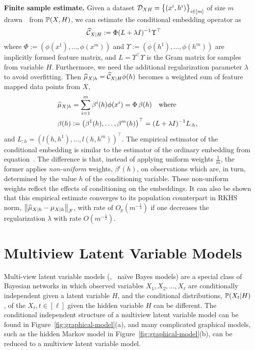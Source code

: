 \documentclass{article}
\newcommand{\hmu}{\widehat{\mu}}
\begin{document}
{\bf Finite sample estimate.} Given a dataset $\mathcal{D}_{XH}=\left\{(x^i,h^i)\right\}_{i\in[m]}$ of size $m$ drawn~\iid~from $\mathbb{P}(X,H)$, we can estimate the conditional embedding operator as
\begin{align}
    & \widehat{\mathcal{C}}_{X|H} := \Phi (L + \lambda I)^{-1} \Upsilon^\top  \label{eq:embeddingoperatorestimator}
\end{align}
where $\Phi:=(\phi(x^1),\ldots,\phi(x^m))$ and $\Upsilon:=(\phi(h^1),\ldots,\phi(h^m))$ are implicitly formed feature matrix, and $L=\Upsilon^\top \Upsilon$ is the Gram matrix for samples from variable $H$. Furthermore, we need the additional regularization parameter $\lambda$ to avoid overfitting. Then $\hmu_{X|h}=\widehat{\Ccal}_{X|H}\phi(h)$ becomes a weighted sum of feature mapped data points from $X$,
\begin{align}
    & \hmu_{X|h} = \sum_{i=1}^m \beta^i(h) \phi(x^i) = \Phi\, \beta(h) \quad \text{where} \,  \label{eq:conditionalembeddingestimator}\\
    & \beta(h) := \rbr{\beta^1(h), \ldots, \beta^m(h)}^\top = (L + \lambda I)^{-1} L_{: h}, \nonumber
\end{align}
and $L_{: h}=(l(h,h^1),\ldots,l(h,h^m))^\top$.
The empirical estimator of the conditional embedding
is similar to the estimator of the ordinary embedding from
equation~. The difference
is that, instead of applying uniform weights $\frac{1}{m}$,
the former applies {\em non-uniform} weights, $\beta^i(h)$, on
observations which are, in turn, determined by the value $h$ of the conditioning
variable. These non-uniform weights reflect the effects of
conditioning on the embeddings. It can also be shown that this empirical estimate converges to its population counterpart in RKHS norm, $\nbr{\hmu_{X|h} - \mu_{X|h}}_{\Fcal}$, with rate of $O_p(m^{-\frac{1}{4}})$ if one decreases the regularization $\lambda$ with rate $O(m^{-\frac{1}{2}})$.

\section{Multiview Latent Variable Models}

Multi-view latent variable models (\eg, \, na\"ive Bayes models) are a
special class of Bayesian networks in which observed variables $X_1, X_2,
\ldots, X_\ell$ are conditionally independent given a latent variable $H$, and
the conditional distributions, $\mathbb{P}(X_t|H)$, of the $X_t, t \in [\ell]$ given the hidden variable $H$ can be different. The conditional independent structure of a multiview latent variable model can be found in Figure~\ref{fig:graphical-model}(a), and many complicated graphical models, such as the hidden Markov model in Figure~\ref{fig:graphical-model}(b), can be reduced to a multiview latent variable model.
\end{document}
